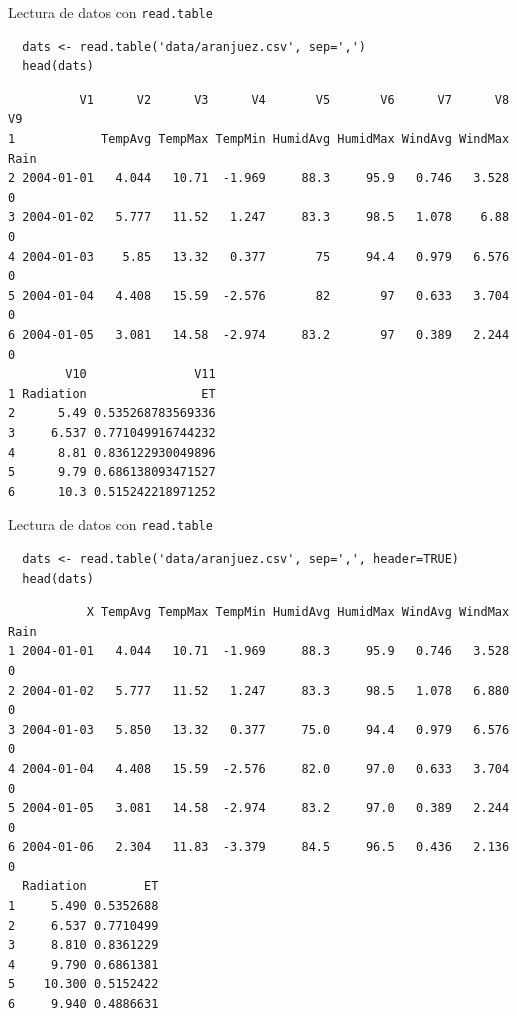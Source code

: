 \documentclass[xcolor={usenames,svgnames,dvipsnames}]{beamer}
\begin{document}
\begin{frame}[fragile,label=sec-5-1-3]{Lectura de datos con \texttt{read.table}}
 \lstset{language=R,label= ,caption= ,numbers=none}
\begin{lstlisting}
  dats <- read.table('data/aranjuez.csv', sep=',')
  head(dats)
\end{lstlisting}

\begin{verbatim}
          V1      V2      V3      V4       V5       V6      V7      V8   V9
1            TempAvg TempMax TempMin HumidAvg HumidMax WindAvg WindMax Rain
2 2004-01-01   4.044   10.71  -1.969     88.3     95.9   0.746   3.528    0
3 2004-01-02   5.777   11.52   1.247     83.3     98.5   1.078    6.88    0
4 2004-01-03    5.85   13.32   0.377       75     94.4   0.979   6.576    0
5 2004-01-04   4.408   15.59  -2.576       82       97   0.633   3.704    0
6 2004-01-05   3.081   14.58  -2.974     83.2       97   0.389   2.244    0
        V10               V11
1 Radiation                ET
2      5.49 0.535268783569336
3     6.537 0.771049916744232
4      8.81 0.836122930049896
5      9.79 0.686138093471527
6      10.3 0.515242218971252
\end{verbatim}
\end{frame}

\begin{frame}[fragile,label=sec-5-1-4]{Lectura de datos con \texttt{read.table}}
 \lstset{language=R,label= ,caption= ,numbers=none}
\begin{lstlisting}
  dats <- read.table('data/aranjuez.csv', sep=',', header=TRUE)
  head(dats)
\end{lstlisting}

\begin{verbatim}
           X TempAvg TempMax TempMin HumidAvg HumidMax WindAvg WindMax Rain
1 2004-01-01   4.044   10.71  -1.969     88.3     95.9   0.746   3.528    0
2 2004-01-02   5.777   11.52   1.247     83.3     98.5   1.078   6.880    0
3 2004-01-03   5.850   13.32   0.377     75.0     94.4   0.979   6.576    0
4 2004-01-04   4.408   15.59  -2.576     82.0     97.0   0.633   3.704    0
5 2004-01-05   3.081   14.58  -2.974     83.2     97.0   0.389   2.244    0
6 2004-01-06   2.304   11.83  -3.379     84.5     96.5   0.436   2.136    0
  Radiation        ET
1     5.490 0.5352688
2     6.537 0.7710499
3     8.810 0.8361229
4     9.790 0.6861381
5    10.300 0.5152422
6     9.940 0.4886631
\end{verbatim}
\end{frame}
\end{document}

